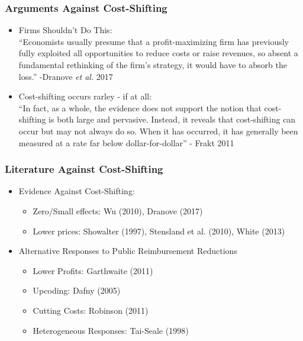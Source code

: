 \documentclass{beamer}
\begin{document}
\begin{frame}
\frametitle{Arguments Against Cost-Shifting} 
\begin{itemize}
\item 
Firms Shouldn't Do This:\\
``Economists usually presume that a profit-maximizing firm has previously fully exploited
all opportunities to reduce costs or raise revenues, so absent a fundamental rethinking of the firm's
strategy, it would have to absorb the loss.'' -Dranove \textit{et al.} 2017

\item Cost-shifting occurs rarley - if at all:\\
``In fact, as a whole, the evidence does not support the notion that cost-shifting is both large and
pervasive. Instead, it reveals that cost-shifting can occur but may not
always do so. When it has occurred, it has generally been measured at a
rate far below dollar-for-dollar'' - Frakt 2011
\end{itemize}
\end{frame}

\begin{frame}
\frametitle{Literature Against Cost-Shifting}
\begin{itemize}
\item Evidence Against Cost-Shifting: 
\begin{itemize}
\item Zero/Small effects: Wu (2010), Dranove (2017)
\item Lower prices: Showalter (1997), Stensland et al. (2010), White (2013)
\end{itemize}
\item Alternative Responses to Public Reimbursement Reductions
\begin{itemize}
\item Lower Profits: Garthwaite (2011)
\item Upcoding:  Dafny (2005)
\item Cutting Costs: Robinson (2011)
\item Heterogeneous Responses: Tai-Seale (1998)
\end{itemize}
\end{itemize}
\end{frame}
\end{document}
